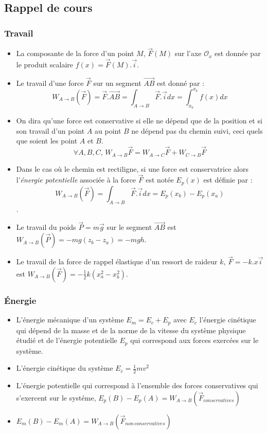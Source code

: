 \documentclass[]{book}
\theoremstyle{definition}
\begin{document}
\subsection*{Rappel de cours}
\subsubsection*{Travail}

\begin{itemize}
\item La composante de la force d'un point $M$, $\vec{F}(M)$ sur l'axe $\mathcal{O}_x$ est donn\'ee par le produit scalaire $f(x) = \vec{F}(M).\vec{i}$. 
\item Le travail d'une force $\vec{F}$ sur un segment $\vec{AB}$ est donn\'e par :
$$W_{A \to B}(\vec{F}) = \vec{F}.\vec{AB} = \int_{A \to B} \vec{F}.\vec{i}dx = \int_{x_a}^{x_b} f(x)dx$$ 
\item On dira qu'une force est conservative si elle ne d\'epend que de la position et si son travail d'un point $A$ au point $B$ ne d\'epend pas du chemin suivi, ceci quels que soient les point $A$ et $B$.
$$\forall A,B,C,\, W_{A \to B} \vec{F} = W_{A \to C} \vec{F} + W_{C \to B} \vec{F}$$
\item Dans le cas o\`u le chemin est rectiligne, si une force est conservatrice alors l'\emph{\'energie potentielle} associ\'ee \`a la force $\vec{F}$ est not\'ee $E_p(x)$ est d\'efinie par :
$$W_{A \to B}(\vec{F}) = \int_{A \to B} \vec{F}.\vec{i}dx = E_p(x_b) - E_p(x_a)$$. 
\item Le travail du poids $\vec{P} = m\vec{g}$ sur le segment $\vec{AB}$ est $W_{A \to B}(\vec{P}) = -mg(z_b - z_a) = -mgh$.
\item Le travail de la force de rappel \'elastique d'un ressort de raideur $k$, $\vec{F} = -k.x\vec{i}$ est $W_{A \to B}(\vec{F}) = -\frac{1}{2}k(x_a^2 - x_b^2)$.
\end{itemize}


\subsubsection*{\'Energie}
\begin{itemize}
\item L'\'energie m\'ecanique d'un syst\`eme $E_m = E_c + E_p$ avec $E_c$ l'\'energie cin\'etique qui d\'epend de la masse et de la norme de la vitesse du syst\`eme physique \'etudi\'e et de l'\'energie potentielle $E_p$ qui correspond aux forces exerc\'ees sur le syst\`eme.
\item L'\'energie cin\'etique du syst\`eme $E_c = \frac{1}{2}mv^2$
\item L'\'energie potentielle qui correspond \`a l'ensemble des forces conservatives qui s'exercent sur le syst\'eme, $E_p(B) - E_p(A) = W_{A \to B}(\vec{F}_{conservatives})$
\item $E_m(B) - E_m(A) = W_{A \to B}(\vec{F}_{non\, conservatives})$
\end{itemize}
\end{document}

